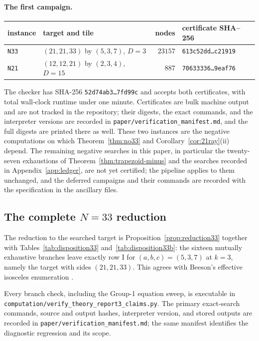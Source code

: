 \documentclass[11pt]{amsart}
\theoremstyle{definition}
\theoremstyle{remark}
\newcommand{\pathcode}[1]{\nolinkurl{#1}}
\begin{document}
\paragraph{The first campaign.}
\begin{center}
\small
\begin{tabular}{@{}llrl@{}}
\toprule
instance & target and tile & nodes & certificate SHA--256 \\
\midrule
\texttt{N33} & $(21,21,33)$ by $(5,3,7)$, $D=3$
  & $23157$ & \texttt{613c52dd\ldots c21919} \\
\texttt{N21} & $(12,12,21)$ by $(2,3,4)$, $D=15$
  & $887$ & \texttt{70633336\ldots9eaf76} \\
\bottomrule
\end{tabular}
\end{center}
\noindent
The checker has SHA-256 \texttt{52d74ab3\ldots7fd99c} and accepts both
certificates, with total wall-clock runtime under one minute.  Certificates are bulk machine output and
are not tracked in the repository; their digests, the exact commands, and the
interpreter versions are recorded in
\pathcode{paper/verification_manifest.md}, and the full digests are printed
there as well.  These two instances are the
negative computations on which Theorem~\ref{thm:no33} and
Corollary~\ref{cor:21ray}(ii) depend.  The remaining negative searches in
this paper, in particular the twenty-seven exhaustions of
Theorem~\ref{thm:trapezoid-minus} and the searches recorded in
Appendix~\ref{app:ledger}, are not yet certified; the pipeline applies to
them unchanged, and the deferred campaigns and their commands are recorded
with the specification in the ancillary files.

\subsection{The complete \texorpdfstring{$N=33$}{N=33} reduction}

The reduction to the searched target is Proposition~\ref{prop:reduction33}
together with Tables~\ref{tab:disposition33} and~\ref{tab:disposition33b}: the sixteen mutually exhaustive
branches leave exactly row I for $(a,b,c)=(5,3,7)$ at $k=3$, namely the
target with sides $(21,21,33)$.  This agrees with Beeson's effective
isosceles enumeration \cite[Theorem~12.10 and Example~2]{BeesonIso}.

Every branch check, including the Group-1 equation sweep, is executable in
\pathcode{computation/verify_theory_report3_claims.py}.  The primary
exact-search commands, source and output hashes, interpreter version, and
stored outputs are recorded in
\pathcode{paper/verification_manifest.md}; the same manifest identifies the
diagnostic regression and its scope.
\end{document}
